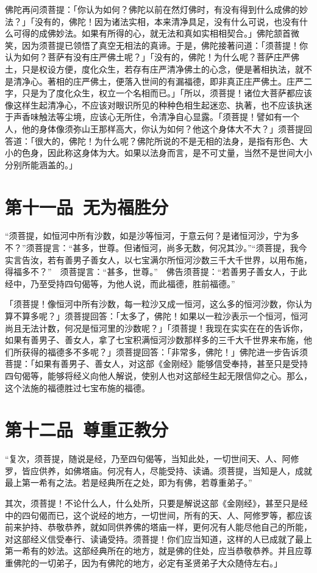 \documentclass[12pt,twoside,openany]{book}
\newcommand{\kai}[1]{{\CJKfamily{kai}#1}}
\begin{document}
\kai{佛陀再问须菩提：「你认为如何？佛陀以前在然灯佛时，有没有得到什么成佛的妙法？」「没有的，佛陀！因为诸法实相，本来清净具足，没有什么可说，也没有什么可得的成佛妙法。如果有所得的心，就无法和真如实相相契合。」佛陀颔首微笑，因为须菩提已领悟了真空无相法的真谛。于是，佛陀接著问道：「须菩提！你认为如何？菩萨有没有庄严佛土呢？」「没有的，佛陀！为什么呢？菩萨庄严佛土，只是权设方便，度化众生，若存有庄严清净佛土的心念，便是著相执法，就不是清净心。著相的庄严佛土，便落入世间的有漏福德，即非真正庄严佛土。庄严二字，只是为了度化众生，权立一个名相而已。」「所以，须菩提！诸位大菩萨都应该像这样生起清净心，不应该对眼识所见的种种色相生起迷恋、执著，也不应该执迷于声香味触法等尘境，应该心无所住，令清净自心显露。「须菩提！譬如有一个人，他的身体像须弥山王那样高大，你认为如何？他这个身体大不大？」须菩提回答道：「很大的，佛陀！为什么呢？佛陀所说的不是无相的法身，是指有形色、大小的色身，因此称这身体为大。如果以法身而言，是不可丈量，当然不是世间大小分别所能涵盖的。」}

\chapter{第十一品\ 无为福胜分}
“须菩提，如恒河中所有沙数，如是沙等恒河，于意云何？是诸恒河沙，宁为多不？”须菩提言：“甚多，世尊。但诸恒河，尚多无数，何况其沙。”“须菩提，我今实言告汝，若有善男子善女人，以七宝满尔所恒河沙数三千大千世界，以用布施，得福多不？”　须菩提言：“甚多，世尊。”　佛告须菩提：“若善男子善女人，于此经中，乃至受持四句偈等，为他人说，而此福德，胜前福德。”

\kai{「须菩提！像恒河中所有沙数，每一粒沙又成一恒河，这么多的恒河沙数，你认为算不算多呢？」须菩提回答：「太多了，佛陀！如果以一粒沙表示一个恒河，恒河尚且无法计数，何况是恒河里的沙数呢？」「须菩提！我现在实实在在的告诉你，如果有善男子、善女人，拿了七宝积满恒河沙数那样多的三千大千世界来布施，他们所获得的福德多不多呢？」须菩提回答：「非常多，佛陀！」佛陀进一步告诉须菩提：「如果有善男子、善女人，对这部《金刚经》能够信受奉持，甚至只是受持四句偈等，能够将经义向他人解说，使别人也对这部经生起无限信仰之心。那么，这个法施的福德胜过七宝布施的福德。
}
\chapter{第十二品\ 尊重正教分}
“复次，须菩提，随说是经，乃至四句偈等，当知此处，一切世间天、人、阿修罗，皆应供养，如佛塔庙。何况有人，尽能受持、读诵。须菩提，当知是人，成就最上第一希有之法。若是经典所在之处，即为有佛，若尊重弟子。”

\kai{其次，须菩提！不论什么人，什么处所，只要是解说这部《金刚经》，甚至只是经中的四句偈而已，这个说经的地方，一切世间，所有的天、人、阿修罗等，都应该前来护持、恭敬恭养，就如同供养佛的塔庙一样，更何况有人能尽他自己的所能，对这部经义信受奉行、读诵受持。须菩提！你们应当知道，这样的人已成就了最上第一希有的妙法。这部经典所在的地方，就是佛的住处，应当恭敬恭养。并且应尊重佛陀的一切弟子，因为有佛陀的地方，必定有圣贤弟子大众随侍左右。」}
\end{document}
